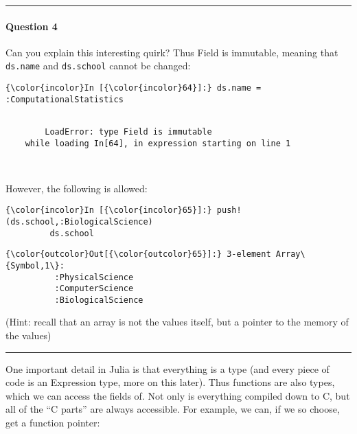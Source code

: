 \documentclass[11pt]{article}
\begin{document}
    \begin{center}\rule{3in}{0.4pt}\end{center}

\paragraph{Question 4}\label{question-4}

Can you explain this interesting quirk? Thus Field is immutable, meaning
that \texttt{ds.name} and \texttt{ds.school} cannot be changed:

    \begin{Verbatim}[commandchars=\\\{\}]
{\color{incolor}In [{\color{incolor}64}]:} ds.name = :ComputationalStatistics
\end{Verbatim}

    \begin{Verbatim}[commandchars=\\\{\}]

        LoadError: type Field is immutable
    while loading In[64], in expression starting on line 1

        

    \end{Verbatim}

    However, the following is allowed:

    \begin{Verbatim}[commandchars=\\\{\}]
{\color{incolor}In [{\color{incolor}65}]:} push!(ds.school,:BiologicalScience)
         ds.school
\end{Verbatim}

            \begin{Verbatim}[commandchars=\\\{\}]
{\color{outcolor}Out[{\color{outcolor}65}]:} 3-element Array\{Symbol,1\}:
          :PhysicalScience  
          :ComputerScience  
          :BiologicalScience
\end{Verbatim}
        
    (Hint: recall that an array is not the values itself, but a pointer to
the memory of the values)

\begin{center}\rule{3in}{0.4pt}\end{center}

    One important detail in Julia is that everything is a type (and every
piece of code is an Expression type, more on this later). Thus functions
are also types, which we can access the fields of. Not only is
everything compiled down to C, but all of the ``C parts'' are always
accessible. For example, we can, if we so choose, get a function
pointer:
\end{document}
